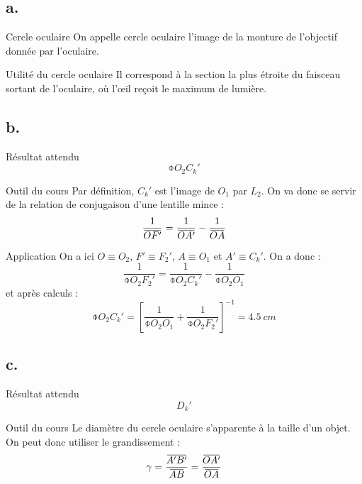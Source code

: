\documentclass[10pt,a5paper,notitlepage]{book}
\begin{document}
\subsection{a.}
\begin{defi}{Cercle oculaire}
    On appelle cercle oculaire l'image de la monture de l'objectif donnée par
    l'oculaire.
\end{defi}

\begin{inte}{Utilité du cercle oculaire}
    Il correspond à la section la plus étroite du faisceau sortant de
    l'oculaire, où l'œil reçoit le maximum de lumière.  
\end{inte}

\setcounter{subsection}{2}
\subsection{b.}
\begin{NCprop}{Résultat attendu}
    $$\obar{O_2C_k'}$$
\end{NCprop}

\begin{NCdemo}{Outil du cours}
    Par définition, $C_k'$ est l'image de $O_1$ par $L_2$. On va donc se servir
    de la relation de conjugaison d'une lentille mince :
    \[ \frac{1}{\OF} = \frac{1}{\OAp} - \frac{1}{\OA} \]
\end{NCdemo}

\begin{NCexem}{Application}
    On a ici $O \equiv O_2$, $F' \equiv F_2'$, $A \equiv O_1$ et $A' \equiv
    C_k'$. On a donc :
    \[ \frac{1}{\obar{O_2F_2'}} = \frac{1}{\obar{O_2C_k'}} -
    \frac{1}{\obar{O_2O_1}} \]
    et après calculs :
    \[ \boxed{\obar{O_2C_k'} = \left[ \frac{1}{\obar{O_2O_1}} +
    \frac{1}{\obar{O_2F_2'}}\right]^{-1} = \SI{+4.5}{cm}} \]
\end{NCexem}

\setcounter{subsection}{2}
\subsection{c.}
\begin{NCprop}{Résultat attendu}
    $$D_k'$$
\end{NCprop}

\begin{NCdemo}{Outil du cours}
    Le diamètre du cercle oculaire s'apparente à la taille d'un objet. On peut
    donc utiliser le grandissement :
    \[ \g = \frac{\ABp}{\ABb} = \frac{\OAp}{\OA} \]
\end{NCdemo}
\end{document}
